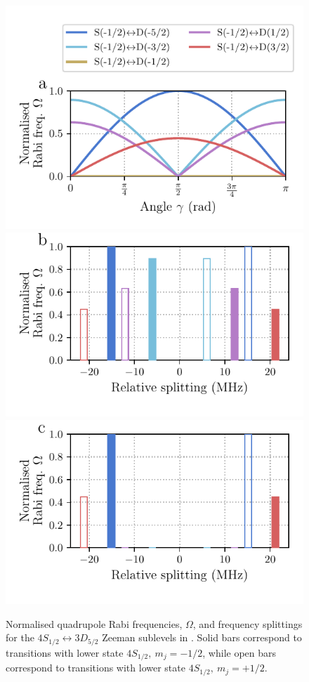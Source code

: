     \begin{figure}
        \vspace*{-0.5cm}
        \begin{center}
        \noindent\includegraphics[width=0.65\linewidth]{
            figures/pdf_figure/qp_gamma.pdf
            }
        \vspace*{-0.5cm}
        \noindent\includegraphics[width=0.65\linewidth]{
            figures/pdf_figure/qp_transition_spectrum_0.25.pdf
            }
        \vspace*{-0.5cm}
        \noindent\includegraphics[width=0.65\linewidth]{
            figures/pdf_figure/qp_transition_spectrum_0.50.pdf
            }
        \end{center}
        \vspace*{-0.5cm}
        \caption{
            Normalised quadrupole Rabi frequencies, $\Omega$, and frequency splittings for the $4S_{1/2} \leftrightarrow 3D_{5/2}$ Zeeman sublevels in \ca. Solid bars correspond to transitions with lower state $4S_{1/2},~m_j = -1/2$, while open bars correspond to transitions with lower state $4S_{1/2},~m_j = +1/2$.
}
\end{figure}
